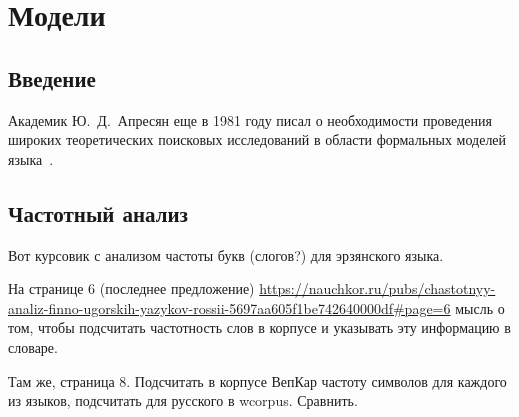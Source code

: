 \chapter{Модели} \label{chapt_models}

\section{Введение} \label{sect_model_intro}
Академик Ю.~Д.~Апресян еще в 1981 году писал о необходимости проведения широких теоретических поисковых исследований в области формальных моделей языка~\cite{Apresjan1981}.

\section{Частотный анализ} \label{sect_ideas_1}


Вот курсовик с анализом частоты букв (слогов?) для эрзянского языка.

На странице 6 (последнее предложение)
\url{https://nauchkor.ru/pubs/chastotnyy-analiz-finno-ugorskih-yazykov-rossii-5697aa605f1be742640000df#page=6}
мысль о том, чтобы подсчитать частотность слов в корпусе и указывать эту информацию в словаре.

Там же, страница 8. Подсчитать в корпусе ВепКар частоту символов для каждого из языков, 
подсчитать для русского в wcorpus. Сравнить.


